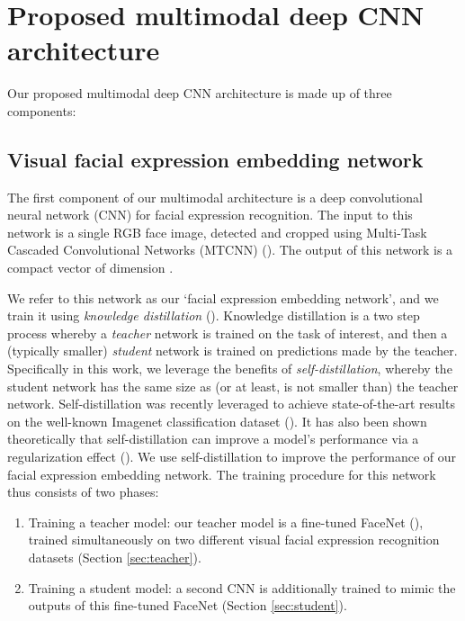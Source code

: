 \documentclass[times,twocolumn,final,authoryear]{elsarticle}
\begin{document}
	\section{Proposed multimodal deep CNN architecture}
	\label{sec:method}
	
	Our proposed multimodal deep CNN architecture is made up of three components:
	
	\subsection{Visual facial expression embedding network}
	\label{sec:cnn}
	
	The first component of our multimodal architecture is a deep convolutional neural network (CNN) for facial expression recognition. The input to this network is a single RGB face image, detected and cropped using Multi-Task Cascaded Convolutional Networks (MTCNN) (\cite{MTCNN}). The output of this network is a compact vector of dimension .
	
	We refer to this network as our `facial expression embedding network', and we train it using \textit{knowledge distillation} (\cite{hinton2015}). Knowledge distillation is a two step process whereby a \textit{teacher} network is trained on the task of interest, and then a (typically smaller) \textit{student} network is trained on predictions made by the teacher. Specifically in this work, we leverage the benefits of \textit{self-distillation}, whereby the student network has the same size as (or at least, is not smaller than) the teacher network. Self-distillation was recently leveraged to achieve state-of-the-art results on the well-known Imagenet classification dataset (\cite{xie2020self}). It has also been shown theoretically that self-distillation can improve a model's performance via a regularization effect (\cite{mobahi2020self}). We use self-distillation to improve the performance of our facial expression embedding network. The training procedure for this network thus consists of two phases:
	\begin{enumerate}
		\item Training a teacher model: our teacher model is a fine-tuned FaceNet (\cite{Schroff2015}), trained simultaneously on two different visual facial expression recognition datasets (Section \ref{sec:teacher}).
		\item Training a student model: a second CNN is additionally trained to mimic the outputs of this fine-tuned FaceNet (Section \ref{sec:student}).
	\end{enumerate}
	
\end{document}
